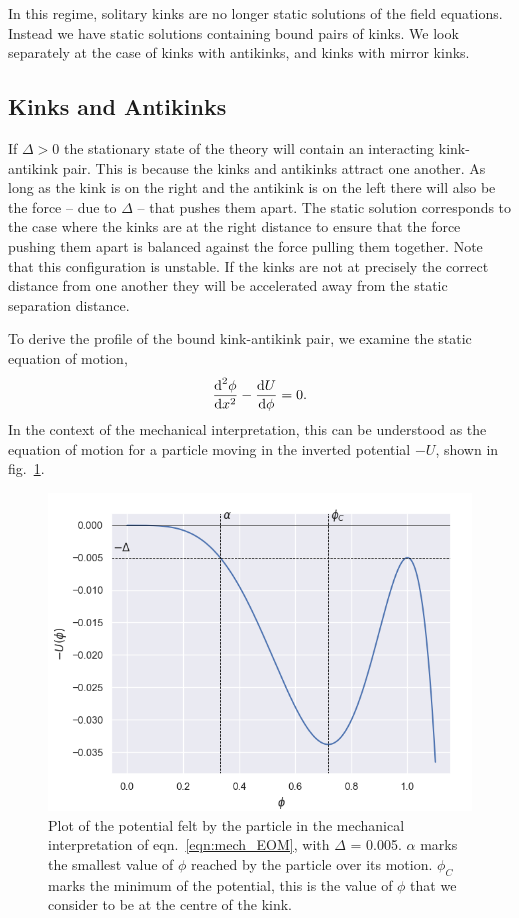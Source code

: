 \documentclass[11pt, oneside]{article}  	%
\numberwithin{equation}{section}
\newcommand{\drv}{\ensuremath{\textup{d}}}
\begin{document}
In this regime, solitary kinks are no longer static solutions of the field equations. Instead we have static solutions containing bound pairs of kinks. We look separately at the case of kinks with antikinks, and kinks with mirror kinks.

\subsection{Kinks and Antikinks}
If $\Delta >0$ the stationary state of the theory will contain an interacting kink-antikink pair. This is because the kinks and antikinks attract one another. As long as the kink is on the right and the antikink is on the left there will also be the force -- due to $\Delta$ -- that pushes them apart. The static solution corresponds to the case where the kinks are at the right distance to ensure that the force pushing them apart is balanced against the force pulling them together. Note that this configuration is unstable. If the kinks are not at precisely the correct distance from one another they will be accelerated away from the static separation distance. \par
To derive the profile of the bound kink-antikink pair, we examine the static equation of motion,
\begin{align}\label{eqn:mech_EOM}
    \frac{\drv^2 \phi}{\drv x^2} - \frac{\drv U}{\drv \phi} = 0.
\end{align}  
In the context of the mechanical interpretation, this can be understood as the equation of motion for a particle moving in the inverted potential $-U$, shown in fig.~\ref{fig:inverted_potential}.\par
\begin{figure}[t]
    \centering
    \includegraphics[width=0.4 \columnwidth]{mechanical_potential_v}
    \caption{Plot of the potential felt by the particle in the mechanical interpretation of eqn.~\ref{eqn:mech_EOM}, with $\Delta$ = 0.005. $\alpha$ marks the smallest value of $\phi$ reached by the particle over its motion. $\phi_C$ marks the minimum of the potential, this is the value of $\phi$ that we consider to be at the centre of the kink.} 
    \label{fig:inverted_potential}
\end{figure}
\end{document}
